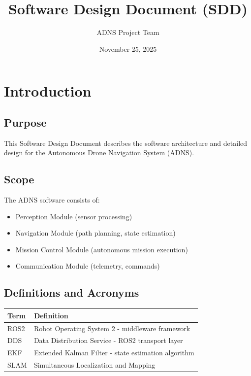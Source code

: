 \documentclass[11pt,a4paper]{article}
\title{Software Design Document (SDD)}
\author{ADNS Project Team}
\date{November 25, 2025}
\begin{document}
\maketitle

\section{Introduction}

\subsection{Purpose}

This Software Design Document describes the software architecture and detailed design for the Autonomous Drone Navigation System (ADNS).

\subsection{Scope}

The ADNS software consists of:
\begin{itemize}
    \item Perception Module (sensor processing)
    \item Navigation Module (path planning, state estimation)
    \item Mission Control Module (autonomous mission execution)
    \item Communication Module (telemetry, commands)
\end{itemize}

\subsection{Definitions and Acronyms}

\begin{table}[h]
\centering
\begin{tabular}{ll}
\toprule
\textbf{Term} & \textbf{Definition} \\
\midrule
ROS2 & Robot Operating System 2 - middleware framework \\
DDS & Data Distribution Service - ROS2 transport layer \\
EKF & Extended Kalman Filter - state estimation algorithm \\
SLAM & Simultaneous Localization and Mapping \\
\bottomrule
\end{tabular}
\end{table}
\end{document}
